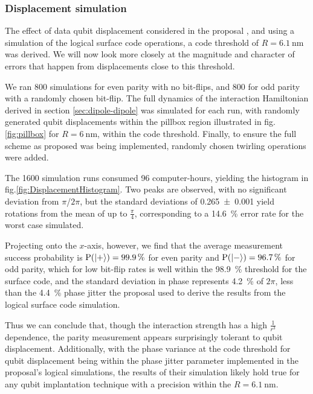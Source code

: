
\subsubsection{Displacement simulation}\label{sec:DisplacementSimulation}
The effect of data qubit displacement considered in the proposal \cite{OGorman2016}, and using a simulation of the logical surface code operations, a code threshold of $R=\SI{6.1}{\nano\metre}$ was derived. We will now look more closely at the magnitude and character of errors that happen from displacements close to this threshold. 

We ran 800 simulations for even parity with no bit-flips, and 800 for odd parity with a randomly chosen bit-flip. The full dynamics of the interaction Hamiltonian derived in section \ref{sec:dipole-dipole} was simulated for each run, with randomly generated qubit displacements within the pillbox region illustrated in fig.\@ \ref{fig:pillbox} for $R = \SI{6}{\nano\metre}$, within the code threshold. Finally, to ensure the full scheme as proposed was being implemented, randomly chosen twirling operations were added.

The 1600 simulation runs consumed 96 computer-hours, yielding the histogram in fig.\@ \ref{fig:DisplacementHistogram}. Two peaks are observed, with no significant deviation from $\pi$/$2\pi$, but the standard deviations of \num{0.265+-0.001} yield rotations from the mean of up to $\tfrac{\pi}{4}$, corresponding to a \SI{14.6}{\percent} error rate for the worst case simulated.

Projecting onto the $x$-axis, however, we find that the average measurement success probability is $\mathrm{P(\ket{+}) = \SI{99.9}{\percent}}$ for even parity and $\mathrm{P(\ket{-}) = \SI{96.7}{\percent}}$ for odd parity, which for low bit-flip rates is well within the \SI{98.9}{\percent} threshold for the surface code, and the standard deviation in phase represents \SI{4.2}{\percent} of $2\pi$, less than the \SI{4.4}{\percent} phase jitter the proposal \cite{OGorman2016} used to derive the results from the logical surface code simulation.

Thus we can conclude that, though the interaction strength has a high $\tfrac{1}{r^3}$ dependence, the parity measurement appears surprisingly tolerant to qubit displacement. Additionally, with the phase variance at the code threshold for qubit displacement being within the phase jitter parameter implemented in the proposal's logical simulations, the results of their simulation likely hold true for any qubit implantation technique with a precision within the $R=\SI{6.1}{\nano\metre}$.


